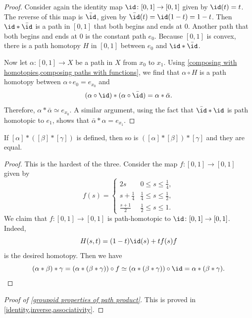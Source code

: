 \documentclass[noname]{notes}
\begin{document}
\begin{proof}
	Consider again the identity map $\id \colon [0,1] \to [0,1]$ given by $\id(t) = t$. The reverse of this map is $\bar{\id}$, given by $\bar\id(t) = \id(1-t) = 1-t$. Then $\id * \bar{\id}$ is a path in $[0,1]$ that both begins and ends at 0. Another path that both begins and ends at $0$ is the constant path $e_0$. Because $[0,1]$ is convex, there is a path homotopy $H$ in $[0,1]$ between $e_0$ and $\id * \bar\id$. 
	
Now let $\alpha \colon [0,1] \to X$ be a path in $X$ from $x_0$ to $x_1$. 
Using \cref{composing with homotopies,composing paths with functions}, we find that $\alpha \circ H$ is a path homotopy between $\alpha \circ e_0 = e_{x_0}$ and 
\[
	(\alpha \circ \id) * (\alpha \circ \bar\id) = \alpha * \bar\alpha.
\]
Therefore, $\alpha * \bar\alpha \simeq e_{x_0}$. A similar argument, using the fact that $\bar\id * \id$ is path homotopic to $e_1$, shows that $\bar \alpha * \alpha = e_{x_1}$. 
\end{proof}

\begin{proposition}
\label{associativity}
	If $[\alpha] * ([\beta] * [\gamma])$ is defined, then so is $([\alpha] * [\beta]) * [\gamma]$ and they are equal. 
\end{proposition}

\begin{proof}
	This is the hardest of the three. Consider the map $f \colon [0,1] \to [0,1]$ given by 
	\[
		f(s) = 
		\begin{cases}
			2s & 0 \leq s \leq \frac 1 4,\\
			s + \frac{1}{4} & \frac{1}{4} \leq s \leq \frac{1}{2}, \\
			\frac{s + 1}{2} & \frac{1}{2} \leq s \leq 1.
		\end{cases}
	\]
	We claim that $f \colon [0,1] \to [0,1]$ is path-homotopic to $\id \colon [0,1] \to [0,1]$. Indeed, 
	\[
		H(s,t) = (1-t)\id(s) + t f(s)f
	\]
	is the desired homotopy. Then we have 
	\[
		(\alpha * \beta) * \gamma = (\alpha * (\beta * \gamma)) \circ f \simeq (\alpha * (\beta * \gamma)) \circ \id = \alpha * (\beta * \gamma). 
	\]
\end{proof}

\begin{proof}[Proof of \cref{groupoid properties of path product}]
	This is proved in \cref{identity,inverse,associativity}. 
\end{proof}


\nocite{*}


\end{document}
